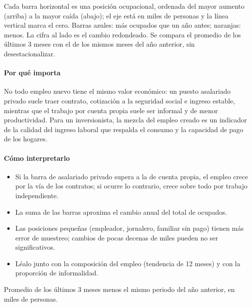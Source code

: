 \begin{leer}
Cada barra horizontal es una posición ocupacional, ordenada del mayor aumento (arriba) a la mayor caída (abajo); el eje está en miles de personas y la línea vertical marca el cero. Barras azules: más ocupados que un año antes; naranjas: menos. La cifra al lado es el cambio redondeado. Se compara el promedio de los últimos 3 meses con el de los mismos meses del año anterior, sin desestacionalizar.
\end{leer}

\paragraph{Por qué importa}
No todo empleo nuevo tiene el mismo valor económico: un puesto asalariado privado suele traer contrato, cotización a la seguridad social e ingreso estable, mientras que el trabajo por cuenta propia suele ser informal y de menor productividad. Para un inversionista, la mezcla del empleo creado es un indicador de la calidad del ingreso laboral que respalda el consumo y la capacidad de pago de los hogares.

\paragraph{Cómo interpretarlo}
\begin{itemize}
\item Si la barra de asalariado privado supera a la de cuenta propia, el empleo crece por la vía de los contratos; si ocurre lo contrario, crece sobre todo por trabajo independiente.
\item La suma de las barras aproxima el cambio anual del total de ocupados.
\item Las posiciones pequeñas (empleador, jornalero, familiar sin pago) tienen más error de muestreo; cambios de pocas decenas de miles pueden no ser significativos.
\item Léalo junto con la composición del empleo (tendencia de 12 meses) y con la proporción de informalidad.
\end{itemize}
\begin{formulas}[Fórmulas]
\end{formulas}
\begin{metodo}[Metodología]
Promedio de los últimos 3 meses menos el mismo periodo del año anterior, en miles de personas.
\par{}
\end{metodo}

